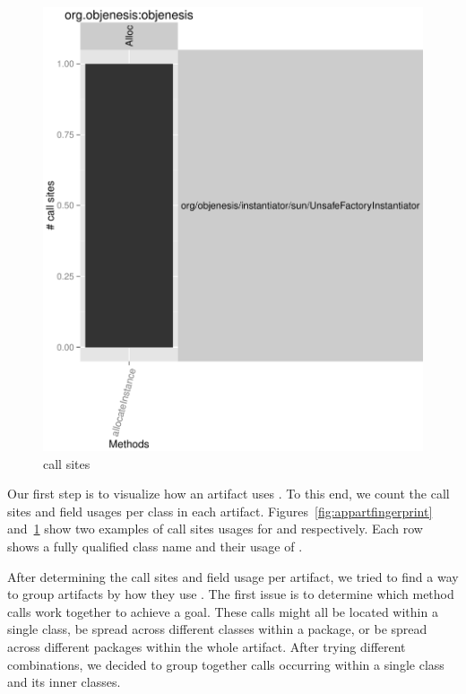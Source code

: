 \begin{figure}[!ht]
\centering
\includegraphics[page=5,width=0.9\columnwidth]{chapters/unsafe/artifacts}
\caption{ call sites}
\label{fig:langartfingerprint}
\end{figure}

Our first step is to visualize how an artifact uses \unsafe{}.
To this end, we count the \unsafe{} call sites and field usages per class in each artifact.
Figures~\ref{fig:appartfingerprint} and~\ref{fig:langartfingerprint} show two examples of call sites usages for  and  respectively.
Each row shows a fully qualified class name and their usage of \smu{}.

After determining the call sites and field usage per artifact, we tried to find a way to group artifacts by how they use \smu{}.
The first issue is to determine which method calls work together to achieve a goal.
These calls might all be located within a single class, be spread across different classes within a package, or be spread across different packages within the whole artifact.
After trying different combinations, we decided to group together calls occurring within a single class and its inner classes.

